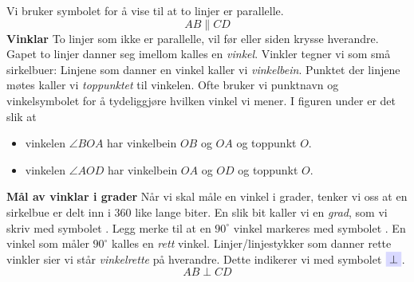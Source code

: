 Vi bruker symbolet \sym{$ \parallel $} for å vise til at to linjer er parallelle.
\[ AB\parallel CD \]
\textbf{Vinklar} \label{vinklar}\os
To linjer som ikke er parallelle, vil før eller siden krysse hverandre. Gapet to linjer danner seg imellom kalles en \textit{vinkel}. Vinkler tegner vi som små sirkelbuer:
Linjene som danner en vinkel kaller vi \textit{vinkelbein}. Punktet der linjene møtes kaller vi \textit{toppunktet} til vinkelen. Ofte bruker vi punktnavn og vinkelsymbolet \sym{$ \angle $} for å tydeliggjøre hvilken vinkel vi mener. I figuren under er det slik at
\begin{itemize}
\item vinkelen $ \angle BOA $  har vinkelbein $ OB $ og $ OA $ og toppunkt $ O $.
\item vinkelen $ \angle AOD $  har vinkelbein $ OA $ og $ OD $ og toppunkt $ O $.	
\end{itemize}
\newpage
\textbf{Mål av vinklar i grader}\os
Når vi skal måle en vinkel i grader, tenker vi oss at en sirkelbue er delt inn i 360 like lange biter. En slik bit kaller vi en \textit{grad}, som vi skriv med symbolet \sym{$ ^\circ $}. 
 \vsk
Legg merke til at en $ 90^\circ $ vinkel markeres med symbolet \sym{$ \square $}. En vinkel som måler $ 90^\circ $ kalles en \textit{rett }vinkel. Linjer/linjestykker som danner rette vinkler sier vi står \textit{vinkelrette} på hverandre. Dette indikerer vi med symbolet $ \sym{$ \perp $} $.
\[ AB\perp CD \]
\newpage
{}\vsk
\label{vinkelend}
\newpage
{}

